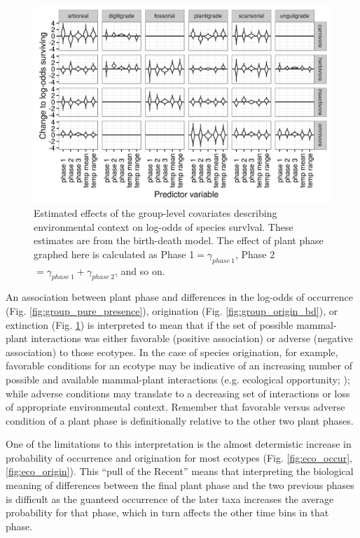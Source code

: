 \documentclass[12pt,letterpaper]{article}
\begin{document}
\begin{figure}[ht]
  \centering
  \includegraphics[width=\textwidth,height=0.4\textheight,keepaspectratio=true]{figure/group_on_survival_bd}
  \caption[Effects of group-level covariates on log-odds of ecotype survival as estimated from the birth-death model]{Estimated effects of the group-level covariates describing environmental context on log-odds of species survlval. These estimates are from the birth-death model. The effect of plant phase graphed here is calculated as Phase 1\( = \gamma_{phase\ 1}\), Phase 2\( = \gamma_{phase\ 1} + \gamma_{phase\ 2}\), and so on.} 
  \label{fig:group_surv_bd}
\end{figure}




An association between plant phase and differences in the log-odds of occurrence (Fig. \ref{fig:group_pure_presence}), origination (Fig. \ref{fig:group_origin_bd}), or extinction (Fig. \ref{fig:group_surv_bd}) is interpreted to mean that if the set of possible mammal-plant interactions was either favorable (positive association) or adverse (negative association) to those ecotypes. In the case of species origination, for example, favorable conditions for an ecotype may be indicative of an increasing number of possible and available mammal-plant interactions (e.g. ecological opportunity; \citealp{Yoder2010,Losos2010,Losos2010a}); while adverse conditions may translate to a decreasing set of interactions or loss of appropriate environmental context. Remember that favorable versus adverse condition of a plant phase is definitionally relative to the other two plant phases. 

One of the limitations to this interpretation is the almost determistic increase in probability of occurrence and origination for most ecotypes (Fig. \ref{fig:eco_occur}, \ref{fig:eco_origin}). This ``pull of the Recent'' means that interpreting the biological meaning of differences between the final plant phase and the two previous phases is difficult as the guanteed occurrence of the later taxa increases the average probability for that phase, which in turn affects the other time bins in that phase.
\end{document}
